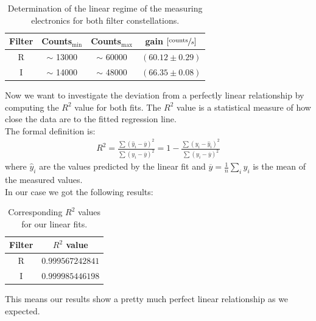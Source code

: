 \begin{table}[H]
\setlength{\tabcolsep}{5mm}
\setlength\extrarowheight{2mm}
\centering
\begin{tabular}{c| c c c }

Filter  & Counts$_{\text{min}}$ & Counts$_{\text{max}}$ & gain $\left[\sfrac{\text{counts}}{s}\right]$ \\ \hline 

R & $\sim$ 13000 & $\sim$ 60000 & $(60.12 \pm 0.29)$ \\
I & $\sim$ 14000 & $\sim$ 48000 & $(66.35 \pm 0.08)$ \\

\end{tabular}
\caption{Determination of the linear regime of the measuring electronics for both filter constellations.}
\end{table}
Now we want to investigate the deviation from a perfectly linear relationship by computing the $R^2$ value for both fits. The $R^2$ value is a statistical measure of how close the data are to the fitted regression line.  \\
The formal definition is:
\begin{align}
	R^2 = 
\frac{\displaystyle\sum\nolimits \left(\hat{y}_i- \overline{y}\right)^2}{\displaystyle\sum\nolimits \left(y_i - \overline{y}\right)^2} 
 =1-\frac{\displaystyle\sum\nolimits \left(y_i - \hat{y}_i\right)^2}{\displaystyle\sum\nolimits \left(y_i - \overline{y}\right)^2}
\end{align}
where $\hat{y}_i$ are the values predicted by the linear fit and $\overline{y} = \frac{1}{n}\sum_{i} y_i$ is the mean of the measured values.\\
In our case we got the following results: 
\begin{table}[H]
\setlength{\tabcolsep}{5mm}
\setlength\extrarowheight{2mm}
\centering
\begin{tabular}{c| c}

Filter  & $ R^2 $ value \\ \hline 

R & $0.999567242841$ \\
I & $0.999985446198$ \\

\end{tabular}
\caption{Corresponding $R^2$ values for our linear fits.}
\end{table}

This means our results show a pretty much perfect linear relationship as we expected.

